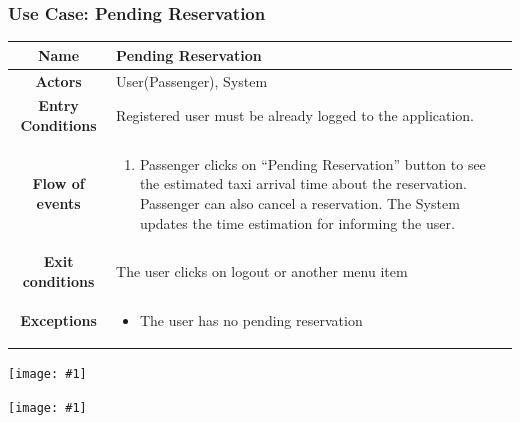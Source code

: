 \documentclass[11pt, a4paper,titlepage]{article}
\newcommand{\image}[1]{
	\begin{center}
		\noindent \texttt{[image: \#1]}
	\end{center}
	}
\begin{document}
\subsubsection{Use Case: Pending Reservation}
		\begin{tabularx}{\textwidth}{| c | X |}
			\hline
			\textbf{Name} & 
			Pending Reservation
			\\
			\hline
			\textbf{Actors} & 
			User(Passenger), System 
			\\
			\hline
			\textbf{Entry Conditions} &
			Registered user must be already logged to the application. 
			\\
			\hline
			\textbf{Flow of events} & 
			\begin{enumerate}
				\item Passenger clicks on “Pending Reservation” button to see the estimated taxi arrival time about the reservation.
				Passenger can also cancel a reservation.
				The System updates the time estimation for informing the user.
			\end{enumerate}						
			\\
			\hline
			\textbf{Exit conditions} & 
			The user clicks on logout or another menu item
			\\
			\hline
			\textbf{Exceptions} & 
			\begin{itemize}
				\item The user has no pending reservation
			\end{itemize} 
			\\
			\hline		
		\end{tabularx}
		\image{usecase_pending_reservation.png}
		\image{diagram_sequence_pending_reservation.png}
		\newpage
\end{document}
